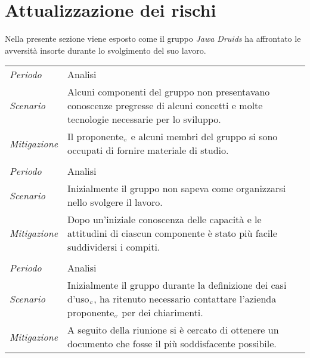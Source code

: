 \chapter{Attualizzazione dei rischi}\label{AttualizzazioneDeiRischi}
Nella presente sezione viene esposto come il gruppo \textit{Jawa Druids} ha affrontato le avversità insorte durante lo svolgimento del suo lavoro.

\def\tabularxcolumn#1{m{#1}}
{
	
	\begin{center}
		\renewcommand{\arraystretch}{1.4}
		\begin{longtable}{|p{5cm}|p{12cm}|}
			\hline
			\rowcolor{airforceblue}
			\multicolumn{2}{|c|}{\textit{RT1- Inesperienza tecnologica}}\\
			\hline
			\textit{Periodo} & Analisi \\
			\hline
			\textit{Scenario} & Alcuni componenti del gruppo non presentavano conoscenze pregresse di alcuni concetti e molte tecnologie necessarie per lo sviluppo. \\
			\hline
			\textit{Mitigazione} & Il proponente$_{\scaleto{G}{3pt}}$ e alcuni membri del gruppo si sono occupati di fornire materiale di studio. \\
			\hline
			\rowcolor{airforceblue}
			\multicolumn{2}{|c|}{\textit{RO4- Inesperienza nel coordinamento}}\\
			\hline
			\textit{Periodo} & Analisi \\
			\hline
			\textit{Scenario} & Inizialmente il gruppo non sapeva come organizzarsi nello svolgere il lavoro. \\
			\hline
			\textit{Mitigazione} & Dopo un'iniziale conoscenza delle capacità e le attitudini di ciascun componente è stato più facile suddividersi i compiti. \\
				\hline
			\rowcolor{airforceblue}
			\multicolumn{2}{|c|}{\textit{RO7- Analisi dei requisiti imperfetta}}\\
			\hline
			\textit{Periodo} & Analisi \\
			\hline
			\textit{Scenario} & Inizialmente il gruppo durante la definizione dei casi d'uso$_{\scaleto{G}{3pt}}$, ha ritenuto necessario contattare l'azienda proponente$_{\scaleto{G}{3pt}}$ per dei chiarimenti. \\
			\hline
			\textit{Mitigazione} & A seguito della riunione si è cercato di ottenere un documento che fosse il più soddisfacente possibile. \\
		\end{longtable}
	\end{center}

}
